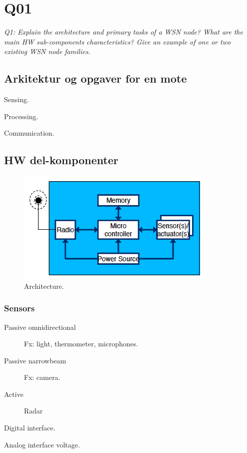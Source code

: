 \chapter{Q01}
\emph{Q1: Explain the architecture and primary tasks of a WSN node? What are
the main HW sub-components characteristics? Give an example of one or two
existing WSN node families.}

\section{Arkitektur og opgaver for en mote}

\begin{description}
\item Sensing.
\item Processing.
\item Communication.
\end{description}

\section{HW del-komponenter}

\begin{figure}[h]
  \centering
  \includegraphics[scale=0.5]{img/moteAnatomy.png}
  \caption{Architecture.}
\end{figure}

\subsection{Sensors}
\begin{description}
\item[Passive omnidirectional] Fx: light, thermometer, microphones.
\item[Passive narrowbeam] Fx: camera.
\item[Active] Radar
\end{description}

\begin{description}
\item Digital interface.
\item Analog interface voltage.
\end{description}


